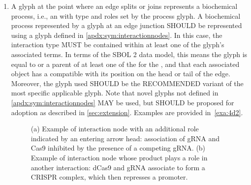 \begin{enumerate}
\item A glyph at the point where an edge splits or joins represents a biochemical process, i.e., an  with type and roles set by the process glyph. 
A biochemical process represented by a glyph at an edge junction SHOULD be represented using a glyph defined in \ref{apdx:sym:interactionnodes}. In this case, the interaction type MUST be contained within at least one of the glyph's associated terms.
In terms of the SBOL 2 data model, this means the glyph is equal to or a parent of at least one of the  for the , and that each associated  object has a  compatible with its position on the head or tail of the edge.
	Moreover, the glyph used SHOULD be the RECOMMENDED variant of the most specific applicable glyph.  Note that novel glyphs not defined in \ref{apdx:sym:interactionnodes} MAY be used, but SHOULD be proposed for adoption as described in \ref{sec:extension}.
	Examples are provided in~\ref{exa:4d2}.

	\begin{figure}[h!]
	\centering
	\hspace{1.0cm}
	\caption{(a) Example of interaction node with an additional role indicated by an entering arrow head:
	association of gRNA and Cas9 inhibited by the presence of a competing gRNA.
	(b) Example of interaction node whose product plays a role in another interaction: dCas9 and gRNA associate to form a CRISPR complex, which then represses a promoter.}
	\label{exa:4d3}
	\end{figure}


\end{enumerate}

